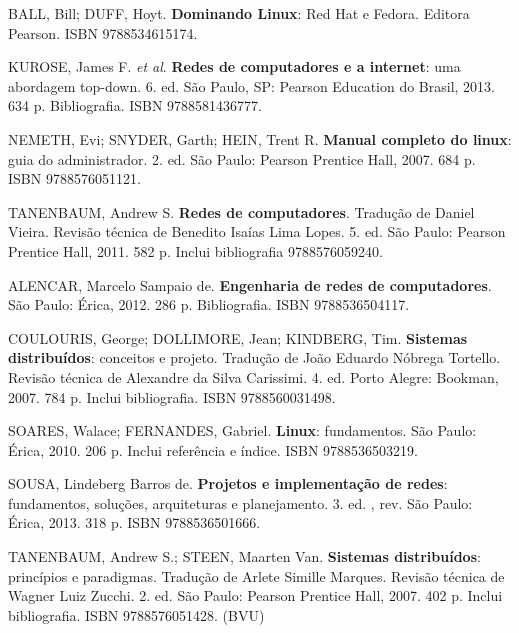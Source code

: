 \begin{pud}
	\begin{bibbasica}
		\item BALL, Bill; DUFF, Hoyt. \textbf{Dominando Linux}: Red Hat e Fedora. Editora Pearson. ISBN 9788534615174. 
		\item KUROSE, James F. \textit{et al}. \textbf{Redes de computadores e a internet}: uma abordagem top-down. 6. ed. São Paulo, SP: Pearson Education do Brasil, 2013. 634 p. Bibliografia. ISBN 9788581436777. 
		\item NEMETH, Evi; SNYDER, Garth; HEIN, Trent R. \textbf{Manual completo do linux}: guia do administrador. 2. ed. São Paulo: Pearson Prentice Hall, 2007. 684 p. ISBN 9788576051121.  
		
		\item TANENBAUM, Andrew S. \textbf{Redes de computadores}. Tradução de Daniel Vieira. Revisão técnica de Benedito Isaías Lima Lopes. 5. ed. São Paulo: Pearson Prentice Hall, 2011. 582 p. Inclui bibliografia 9788576059240.  

		
	\end{bibbasica}
	
	\begin{bibcomplementar}
	
		\item ALENCAR, Marcelo Sampaio de. \textbf{Engenharia de redes de computadores}. São Paulo: Érica, 2012. 286 p. Bibliografia. ISBN 9788536504117.
		\item COULOURIS, George; DOLLIMORE, Jean; KINDBERG, Tim. \textbf{Sistemas distribuídos}: conceitos e projeto. Tradução de João Eduardo Nóbrega Tortello. Revisão técnica de Alexandre da Silva Carissimi. 4. ed. Porto Alegre: Bookman, 2007. 784 p. Inclui bibliografia. ISBN 9788560031498.
		\item SOARES, Walace; FERNANDES, Gabriel. \textbf{Linux}: fundamentos. São Paulo: Érica, 2010. 206 p. Inclui referência e índice. ISBN 9788536503219.
		\item SOUSA, Lindeberg Barros de. \textbf{Projetos e implementação de redes}: fundamentos, soluções, arquiteturas e planejamento. 3. ed. , rev. São Paulo: Érica, 2013. 318 p. ISBN 9788536501666.		
		\item TANENBAUM, Andrew S.; STEEN, Maarten Van. \textbf{Sistemas distribuídos}: princípios e paradigmas. Tradução de Arlete Simille Marques. Revisão técnica de Wagner Luiz Zucchi. 2. ed. São Paulo: Pearson Prentice Hall, 2007. 402 p. Inclui bibliografia. ISBN 9788576051428. (BVU)

	\end{bibcomplementar}

\end{pud}




